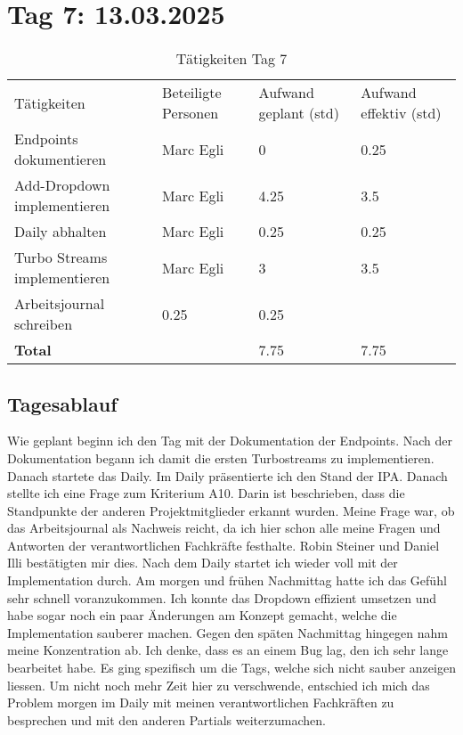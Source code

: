 \section{Tag 7: 13.03.2025}
\begin{table}[H]
    \begin{tabular}{|L{0.4\textwidth}|C{60pt}|C{60pt}|C{60pt}|}
        \hline
        \color{white}Tätigkeiten & \color{white}Beteiligte \color{white}Personen & \color{white}Aufwand geplant (std) & \color{white}Aufwand effektiv (std) \\
        Endpoints dokumentieren & Marc Egli & 0 & 0.25 \\
        \hline
        Add-Dropdown implementieren & Marc Egli & 4.25 & 3.5 \\
        \hline
        Daily abhalten & Marc Egli & 0.25 & 0.25 \\
        \hline
        Turbo Streams implementieren & Marc Egli & 3 & 3.5 \\
        \hline
        Arbeitsjournal schreiben & 0.25 & 0.25 \\
        \textbf{Total} &  & 7.75 & 7.75 \\
        \hline
    \end{tabular}
    \caption{Tätigkeiten Tag 7}
\end{table}

\subsection*{Tagesablauf}
Wie geplant beginn ich den Tag mit der Dokumentation der Endpoints. Nach der Dokumentation begann ich damit die ersten Turbostreams zu implementieren.
Danach startete das Daily. Im Daily präsentierte ich den Stand der IPA. Danach stellte ich eine Frage zum Kriterium A10. Darin ist beschrieben, dass die Standpunkte der
anderen Projektmitglieder erkannt wurden. Meine Frage war, ob das Arbeitsjournal als Nachweis reicht, da ich hier schon alle meine Fragen und Antworten der verantwortlichen 
Fachkräfte festhalte. Robin Steiner und Daniel Illi bestätigten mir dies. Nach dem Daily startet ich wieder voll mit der Implementation durch. 
Am morgen und frühen Nachmittag hatte ich das Gefühl sehr schnell voranzukommen. Ich konnte das Dropdown effizient umsetzen und habe sogar noch ein paar Änderungen am Konzept gemacht,
welche die Implementation sauberer machen. Gegen den späten Nachmittag hingegen nahm meine Konzentration ab. Ich denke, dass es an einem Bug lag, den ich sehr lange
bearbeitet habe. Es ging spezifisch um die Tags, welche sich nicht sauber anzeigen liessen. Um nicht noch mehr Zeit hier zu verschwende, entschied ich mich
das Problem morgen im Daily mit meinen verantwortlichen Fachkräften zu besprechen und mit den anderen Partials weiterzumachen. 

